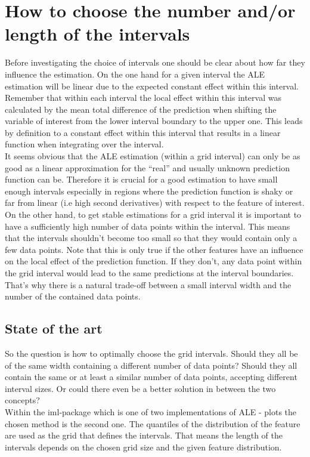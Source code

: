 \documentclass[
]{krantz}
\begin{document}
\hypertarget{how-to-choose-the-number-andor-length-of-the-intervals}{%
\section{How to choose the number and/or length of the intervals}\label{how-to-choose-the-number-andor-length-of-the-intervals}}

Before investigating the choice of intervals one should be clear about how far they influence the estimation. On the one hand for a given interval the ALE estimation will be linear due to the expected constant effect within this interval.
Remember that within each interval the local effect within this interval was calculated by the mean total difference of the prediction when shifting the variable of interest from the lower interval boundary to the upper one. This leads by definition to a constant effect within this interval that results in a linear function when integrating over the interval.\\
It seems obvious that the ALE estimation (within a grid interval) can only be as good as a linear approximation for the ``real'' and usually unknown prediction function can be. Therefore it is crucial for a good estimation to have small enough intervals especially in regions where the prediction function is shaky or far from linear (i.e high second derivatives) with respect to the feature of interest.
On the other hand, to get stable estimations for a grid interval it is important to have a sufficiently high number of data points within the interval. This means that the intervals shouldn't become too small so that they would contain only a few data points. Note that this is only true if the other features have an influence on the local effect of the prediction function. If they don't, any data point within the grid interval would lead to the same predictions at the interval boundaries.
That's why there is a natural trade-off between a small interval width and the number of the contained data points.

\hypertarget{state-of-the-art}{%
\subsection{State of the art}\label{state-of-the-art}}

So the question is how to optimally choose the grid intervals. Should they all be of the same width containing a different number of data points? Should they all contain the same or at least a similar number of data points, accepting different interval sizes. Or could there even be a better solution in between the two concepts?\\
Within the iml-package which is one of two implementations of ALE - plots the chosen method is the second one. The quantiles of the distribution of the feature are used as the grid that defines the intervals. That means the length of the intervals depends on the chosen grid size and the given feature distribution.
\end{document}
